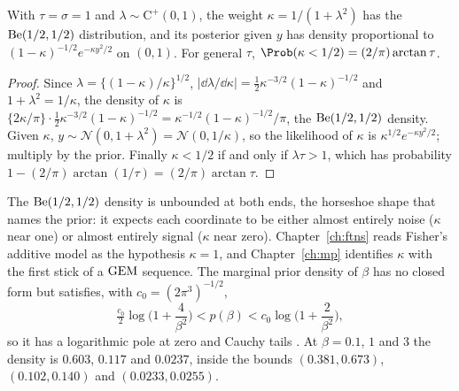 \begin{proposition}\label{toolkit:prop:kappa}
With $\tau=\sigma=1$ and $\lambda\sim\mathrm{C}^+(0,1)$, the weight $\kappa=1/(1+\lambda^2)$ has the
$\mathrm{Be}(1/2,1/2)$ distribution, and its posterior given $y$ has density proportional to
$(1-\kappa)^{-1/2}e^{-\kappa y^2/2}$ on $(0,1)$. For general $\tau$,
$\Prob(\kappa<1/2)=(2/\pi)\arctan\tau$.
\end{proposition}

\begin{proof}
Since $\lambda=\{(1-\kappa)/\kappa\}^{1/2}$, $|\dd\lambda/\dd\kappa|=\tfrac12\kappa^{-3/2}(1-\kappa)^{-1/2}$
and $1+\lambda^2=1/\kappa$, the density of $\kappa$ is
$\{2\kappa/\pi\}\cdot\tfrac12\kappa^{-3/2}(1-\kappa)^{-1/2}=\kappa^{-1/2}(1-\kappa)^{-1/2}/\pi$, the
$\mathrm{Be}(1/2,1/2)$ density. Given $\kappa$, $y\sim\mathcal{N}(0,1+\lambda^2)=\mathcal{N}(0,1/\kappa)$, so
the likelihood of $\kappa$ is $\kappa^{1/2}e^{-\kappa y^2/2}$; multiply by the prior. Finally
$\kappa<1/2$ if and only if $\lambda\tau>1$, which has probability $1-(2/\pi)\arctan(1/\tau)
=(2/\pi)\arctan\tau$.
\end{proof}

The $\mathrm{Be}(1/2,1/2)$ density is unbounded at both ends, the horseshoe shape that names the prior:
it expects each coordinate to be either almost entirely noise ($\kappa$ near one) or almost
entirely signal ($\kappa$ near zero). Chapter~\ref{ch:ftns} reads Fisher's additive model as the
hypothesis $\kappa=1$, and Chapter~\ref{ch:mp} identifies $\kappa$ with the first stick of a
$\mathrm{GEM}$ sequence. The marginal prior density of $\beta$ has no closed form but satisfies, with
$c_0=(2\pi^3)^{-1/2}$,
\begin{equation}\label{toolkit:eq:hsbounds}
\tfrac {c_0}2\log\Big(1+\frac4{\beta^2}\Big)<p(\beta)<c_0\log\Big(1+\frac2{\beta^2}\Big),
\end{equation}
so it has a logarithmic pole at zero and Cauchy tails \citep{toolkit:carvalho2010}. At
$\beta=0.1$, $1$ and $3$ the density is $0.603$, $0.117$ and $0.0237$, inside the bounds
$(0.381,0.673)$, $(0.102,0.140)$ and $(0.0233,0.0255)$.

